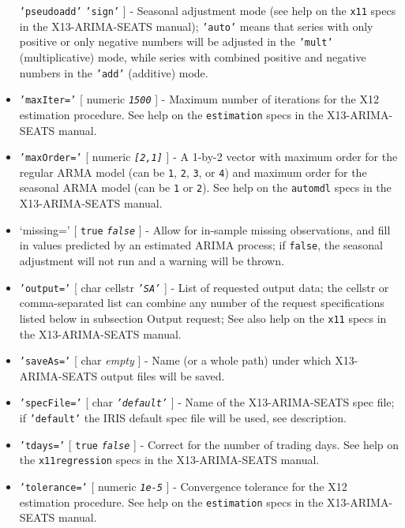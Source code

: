 \begin{itemize}
  \texttt{'pseudoadd'} \textbar{} \texttt{'sign'} {]} - Seasonal
  adjustment mode (see help on the \texttt{x11} specs in the
  X13-ARIMA-SEATS manual); \texttt{'auto'} means that series with only
  positive or only negative numbers will be adjusted in the
  \texttt{'mult'} (multiplicative) mode, while series with combined
  positive and negative numbers in the \texttt{'add'} (additive) mode.
\item
  \texttt{'maxIter='} {[} numeric \textbar{} \emph{\texttt{1500}} {]} -
  Maximum number of iterations for the X12 estimation procedure. See
  help on the \texttt{estimation} specs in the X13-ARIMA-SEATS manual.
\item
  \texttt{'maxOrder='} {[} numeric \textbar{} \emph{\texttt{{[}2,1{]}}}
  {]} - A 1-by-2 vector with maximum order for the regular ARMA model
  (can be \texttt{1}, \texttt{2}, \texttt{3}, or \texttt{4}) and maximum
  order for the seasonal ARMA model (can be \texttt{1} or \texttt{2}).
  See help on the \texttt{automdl} specs in the X13-ARIMA-SEATS manual.
\item
  `missing=' {[} \texttt{true} \textbar{} \emph{\texttt{false}} {]} -
  Allow for in-sample missing observations, and fill in values predicted
  by an estimated ARIMA process; if \texttt{false}, the seasonal
  adjustment will not run and a warning will be thrown.
\item
  \texttt{'output='} {[} char \textbar{} cellstr \textbar{}
  \emph{\texttt{'SA'}} {]} - List of requested output data; the cellstr
  or comma-separated list can combine any number of the request
  specifications listed below in subsection Output request; See also
  help on the \texttt{x11} specs in the X13-ARIMA-SEATS manual.
\item
  \texttt{'saveAs='} {[} char \textbar{} \emph{empty} {]} - Name (or a
  whole path) under which X13-ARIMA-SEATS output files will be saved.
\item
  \texttt{'specFile='} {[} char \textbar{} \emph{\texttt{'default'}} {]}
  - Name of the X13-ARIMA-SEATS spec file; if \texttt{'default'} the
  IRIS default spec file will be used, see description.
\item
  \texttt{'tdays='} {[} \texttt{true} \textbar{} \emph{\texttt{false}}
  {]} - Correct for the number of trading days. See help on the
  \texttt{x11regression} specs in the X13-ARIMA-SEATS manual.
\item
  \texttt{'tolerance='} {[} numeric \textbar{} \emph{\texttt{1e-5}} {]}
  - Convergence tolerance for the X12 estimation procedure. See help on
  the \texttt{estimation} specs in the X13-ARIMA-SEATS manual.
\end{itemize}

